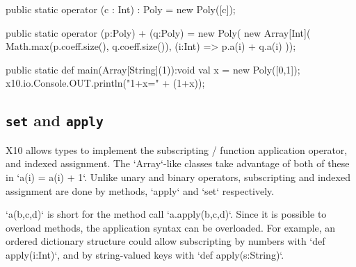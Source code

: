 
\begin{xten}
  public static operator (c : Int) : Poly = new Poly([c]);

  public static operator (p:Poly) + (q:Poly) = new Poly(
      new Array[Int](
        Math.max(p.coeff.size(), q.coeff.size()),
        (i:Int) => p.a(i) + q.a(i)
     ));

  public static def main(Array[String](1)):void {
     val x = new Poly([0,1]);
     x10.io.Console.OUT.println("1+x=" + (1+x));
  }
\end{xten}


\subsection{{\tt set} and {\tt apply}}
\index{()}
\index{()=}
\label{set-and-apply}
X10 allows types to implement the subscripting / function application
operator, and indexed assignment.  The \xcd`Array`-like classes take advantage
of both of these in \xcd`a(i) = a(i) + 1`.  Unlike unary and binary operators,
subscripting and indexed assignment are done by methods, \xcd`apply` and
\xcd`set` respectively.

\xcd`a(b,c,d)` is short for the method call \xcd`a.apply(b,c,d)`.  Since it is
possible to overload methods, the application syntax can be overloaded.  For
example, an ordered dictionary structure could allow subscripting by numbers
with \xcd`def apply(i:Int)`, and by string-valued keys with 
\xcd`def apply(s:String)`.  


